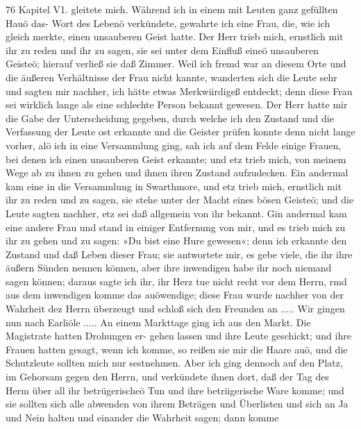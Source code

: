 76 Kapitel V1.
gleitete mich. Während ich in einem mit Leuten ganz gefüllten
Hauö das- Wort des Lebenö verkündete, gewahrte ich eine Frau,
die, wie ich gleich merkte, einen unsauberen Geist hatte. Der
Herr trieb mich, ernstlich mit ihr zu reden und ihr zu sagen, sie
sei unter dem Einfluß eineö unsauberen Geisteö; hierauf verließ
sie daß Zimmer. Weil ich fremd war an diesem Orte und die
äußeren Verhältnisse der Frau nicht kannte, wanderten sich die
Leute sehr und sagten mir nachher, ich hätte etwas Merkwiirdigeß
entdeckt; denn diese Frau sei wirklich lange als eine schlechte
Person bekannt gewesen. Der Herr hatte mir die Gabe der
Unterscheidung gegeben, durch welche ich den Zustand und die
Verfassung der Leute ost erkannte und die Geister prüfen konnte
denn nicht lange vorher, alö ich in eine Versammlung ging, sah
ich auf dem Felde einige Frauen, bei denen ich einen unsauberen
Geist erkannte; und etz trieb mich, von meinem Wege ab zu ihnen
zu gehen und ihnen ihren Zustand aufzudecken. Ein andermal
kam eine in die Versammlung in Swarthmore, und etz trieb mich,
ernstlich mit ihr zu reden und zu sagen, sie stehe unter der Macht
eines bösen Geisteö; und die Leute sagten nachher, etz sei daß
allgemein von ihr bekannt. Gin andermal kam eine andere Frau
und stand in einiger Entfernung von mir, und es trieb mich zu
ihr zu gehen und zu sagen: »Du bist eine Hure gewesen«; denn
ich erkannte den Zustand und daß Leben dieser Frau; sie antwortete
mir, es gebe viele, die ihr ihre äußern Sünden nennen können,
aber ihre inwendigen habe ihr noch niemand sagen können; daraus
sagte ich ihr, ihr Herz tue nicht recht vor dem Herrn, rmd
aus dem inwendigen komme das auöwendige; diese Frau wurde
nachher von der Wahrheit dez Herrn überzeugt und schloß sich
den Freunden an .....
Wir gingen nun nach Earliöle ..... An einem Markttage
ging ich aus den Markt. Die Magistrate hatten Drohungen er-
gehen lassen und ihre Leute geschickt; und ihre Frauen hatten
gesagt, wenn ich komme, so reißen sie mir die Haare auö, und
die Schutzleute sollten mich nur sestnehmen. Aber ich ging dennoch
auf den Platz, im Gehorsam gegen den Herrn, und verkündete
ihnen dort, daß der Tag des Herm über all ihr betrügerischeö
Tun und ihre betriigerische Ware komme; und sie sollten sich alle
abwenden von ihrem Beträgen und Überlisten und sich an Ja
und Nein halten und einander die Wahrheit sagen; dann komme


